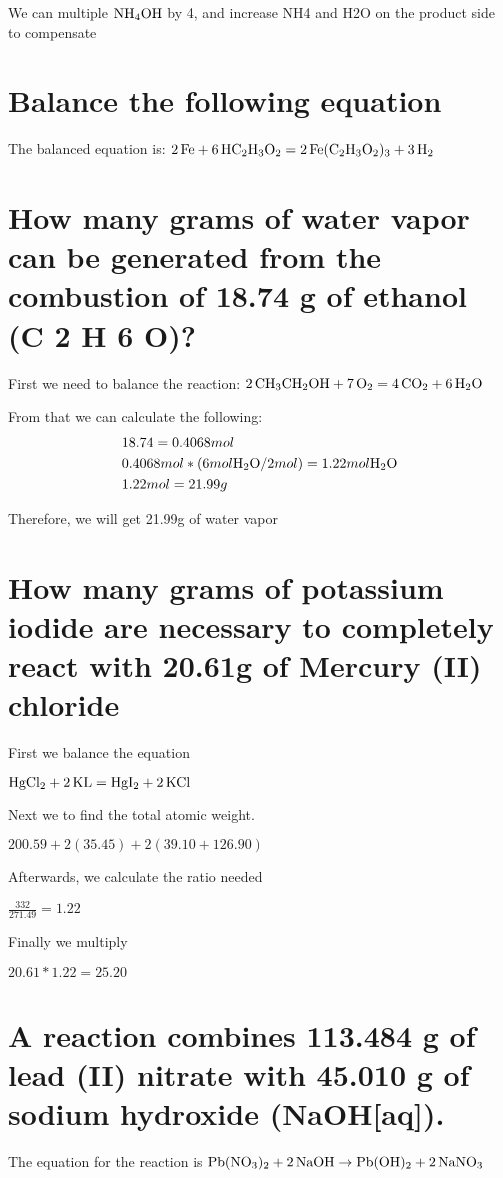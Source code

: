 \documentclass{scrartcl}
\begin{document}
We can multiple \(\ce{NH4OH}\) by 4, and increase NH4 and H2O on the product side to compensate

\section{Balance the following equation}
\label{sec:org039a49b}
The balanced equation is:
\(\ce{2Fe}+\ce{6HC2H3O2}=\ce{2Fe(C2H3O2)3}+\ce{3H2}\)

\section{How many grams of water vapor can be generated from the combustion of 18.74 g of ethanol (C 2 H 6 O)?}
\label{sec:org9ed9cc6}
First we need to balance the reaction:
\(\ce{2CH3CH2OH}+\ce{7O2}=\ce{4CO2}+\ce{6H2O}\)

From that we can calculate the following:
\begin{align*}
&18.74=0.4068 mol\\
&0.4068 mol * (6 mol \ce{H2O}/2 mol) = 1.22 mol \ce{H2O}\\
&1.22 mol = 21.99 g
\end{align*}

Therefore, we will get 21.99g of water vapor

\section{How many grams of potassium iodide are necessary to completely react with 20.61g of Mercury (II) chloride}
\label{sec:orgf49d021}
First we balance the equation

\(\ce{HgCl2}+\ce{2KL}=\ce{HgI2}+\ce{2KCl}\)

Next we to find the total atomic weight.

\(200.59+2(35.45)+2(39.10+126.90)\)

Afterwards, we calculate the ratio needed

\(\frac{332}{271.49}=1.22\)

Finally we multiply

\(20.61*1.22=25.20\)

\section{A reaction combines 113.484 g of lead (II) nitrate with 45.010 g of sodium hydroxide (NaOH[aq]).}
\label{sec:org2357d9f}
The equation for the reaction is
\(\ce{Pb(NO3)2}+\ce{2NaOH}\rightarrow\ce{Pb(OH)2}+\ce{2NaNO3}\)
\end{document}
